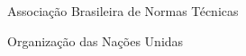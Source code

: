 \begin{siglas}
\item[ABNT] Associação Brasileira de Normas Técnicas
\item[ONU] Organização das Nações Unidas
\end{siglas}

